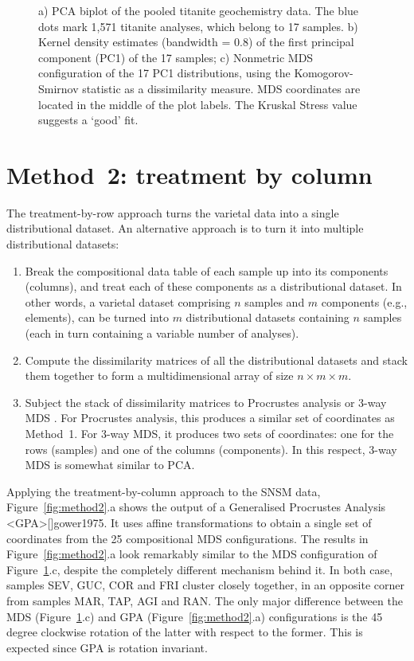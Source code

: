 \documentclass{article}
\begin{document}
\begin{figure}
\caption{a) PCA biplot of the pooled titanite geochemistry data. The
  blue dots mark 1,571 titanite analyses, which belong to 17
  samples. b) Kernel density estimates (bandwidth = 0.8) of the first
  principal component (PC1) of the 17 samples; c) Nonmetric MDS
  configuration of the 17 PC1 distributions, using the
  Komogorov-Smirnov statistic as a dissimilarity measure. MDS
  coordinates are located in the middle of the plot labels. The
  Kruskal Stress value suggests a `good' fit.}
\label{fig:method1}
\end{figure}

\section{Method~2: treatment by column}\label{sec:method2}

The treatment-by-row approach turns the varietal data into a single
distributional dataset. An alternative approach is to turn it into
multiple distributional datasets:

\begin{enumerate}
\item Break the compositional data table of each sample up into its
  components (columns), and treat each of these components as a
  distributional dataset. In other words, a varietal dataset
  comprising $n$ samples and $m$ components (e.g., elements), can be
  turned into $m$ distributional datasets containing $n$ samples (each
  in turn containing a variable number of analyses).
\item Compute the dissimilarity matrices of all the distributional
  datasets and stack them together to form a multidimensional array of
  size ${n}\times{m}\times{m}$.
\item Subject the stack of dissimilarity matrices to Procrustes
  analysis or 3-way MDS \cite{carroll1970, gower1975,
    vermeesch2015}. For Procrustes analysis, this produces a similar
  set of coordinates as Method~1.  For 3-way MDS, it produces two sets
  of coordinates: one for the rows (samples) and one of the columns
  (components). In this respect, 3-way MDS is somewhat similar to PCA.
\end{enumerate}

Applying the treatment-by-column approach to the SNSM data,
Figure~\ref{fig:method2}.a shows the output of a Generalised
Procrustes Analysis \citeA<GPA>[]{gower1975}. It uses affine
transformations to obtain a single set of coordinates from the 25
compositional MDS configurations. The results in
Figure~\ref{fig:method2}.a look remarkably similar to the MDS
configuration of Figure~\ref{fig:method1}.c, despite the completely
different mechanism behind it. In both case, samples SEV, GUC, COR and
FRI cluster closely together, in an opposite corner from samples MAR,
TAP, AGI and RAN. The only major difference between the MDS
(Figure~\ref{fig:method1}.c) and GPA (Figure~\ref{fig:method2}.a)
configurations is the 45 degree clockwise rotation of the latter with
respect to the former. This is expected since GPA is rotation
invariant.\medskip
\end{document}
